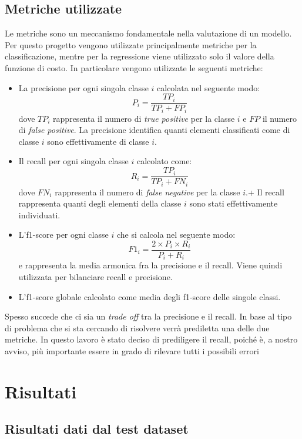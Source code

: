 \subsection{Metriche utilizzate}\label{subsec:metriche}
Le metriche sono un meccanismo fondamentale nella valutazione di un modello. 
Per questo progetto vengono utilizzate principalmente metriche per la classificazione, mentre per la regressione viene utilizzato solo il valore della funzione di costo.
In particolare vengono utilizzate le seguenti metriche:
    \begin{itemize}
        \item La precisione per ogni singola classe $i$ calcolata nel seguente modo:
            \[P_i = \frac{TP_i}{TP_i + FP_i}\]
            dove $TP_i$ rappresenta il numero di \textit{true positive} per la classe $i$ e $FP$ il numero di \textit{false positive}.
            La precisione identifica quanti elementi classificati come di classe $i$ sono effettivamente di classe $i$.
        \item Il recall per ogni singola classe $i$ calcolato come:
            \[R_i = \frac{TP_i}{TP_i + FN_i}\]
            dove $FN_i$ rappresenta il numero di \textit{false negative} per la classe $i$.+
            Il recall rappresenta quanti degli elementi della classe $i$ sono stati effettivamente individuati.
        \item L'f1-score per ogni classe $i$ che si calcola nel seguente modo:
            \[F1_i = \frac{2 \times P_i \times R_i}{P_i + R_i}\]
            e rappresenta la media armonica fra la precisione e il recall. Viene quindi utilizzata per bilanciare recall e precisione.
        \item L'f1-score globale calcolato come media degli f1-score delle singole classi.
    \end{itemize}
Spesso succede che ci sia un \textit{trade off} tra la precisione e il recall.
In base al tipo di problema che si sta cercando di risolvere verrà prediletta una delle due metriche.
In questo lavoro è stato deciso di prediligere il recall, poiché è, a nostro avviso, più importante essere in grado di rilevare tutti i possibili errori  

\section{Risultati}
\subsection{Risultati dati dal test dataset}
